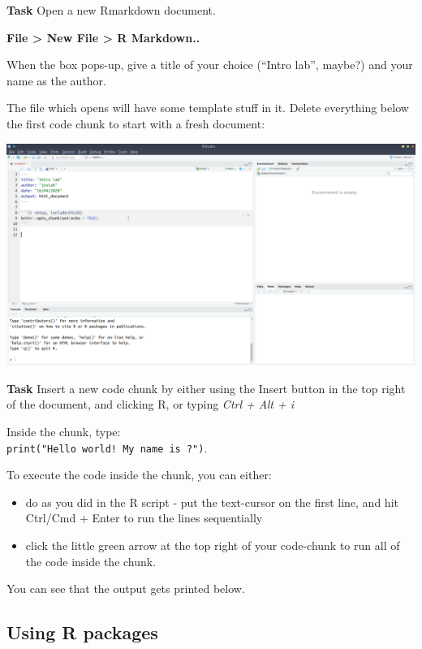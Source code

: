 \documentclass[]{book}
\providecommand{\tightlist}{%
  \setlength{\itemsep}{0pt}\setlength{\parskip}{0pt}}
\begin{document}
\textbf{Task}
Open a new Rmarkdown document.

\textbf{File \textgreater{} New File \textgreater{} R Markdown..}

When the box pops-up, give a title of your choice (``Intro lab'', maybe?) and your name as the author.

The file which opens will have some template stuff in it. Delete everything below the first code chunk to start with a fresh document:

\includegraphics{images/installing_intro/ss_newrmd.png}

\textbf{Task}
Insert a new code chunk by either using the Insert button in the top right of the document, and clicking R, or typing \emph{Ctrl + Alt + i}

Inside the chunk, type:\\
\texttt{print("Hello\ world!\ My\ name\ is\ ?")}.

To execute the code inside the chunk, you can either:

\begin{itemize}
\tightlist
\item
  do as you did in the R script - put the text-cursor on the first line, and hit Ctrl/Cmd + Enter to run the lines sequentially
\item
  click the little green arrow at the top right of your code-chunk to run all of the code inside the chunk.
\end{itemize}

You can see that the output gets printed below.

\hypertarget{using-r-packages}{%
\subsection*{Using R packages}\label{using-r-packages}}
\end{document}
